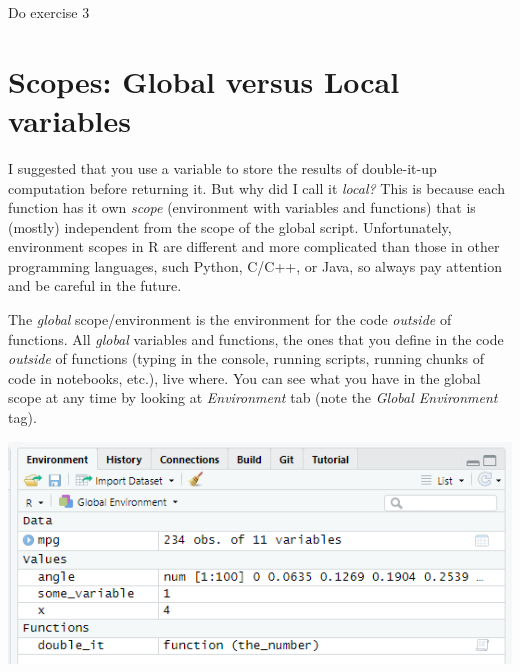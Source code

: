 \documentclass[
]{book}
\begin{document}
Do exercise 3

\hypertarget{scopes-global-versus-local-variables}{%
\section{Scopes: Global versus Local variables}\label{scopes-global-versus-local-variables}}

I suggested that you use a variable to store the results of double-it-up computation before returning it. But why did I call it \emph{local?} This is because each function has it own \emph{scope} (environment with variables and functions) that is (mostly) independent from the scope of the global script. Unfortunately, environment scopes in R are different and more complicated than those in other programming languages, such Python, C/C++, or Java, so always pay attention and be careful in the future.

The \emph{global} scope/environment is the environment for the code \emph{outside} of functions. All \emph{global} variables and functions, the ones that you define in the code \emph{outside} of functions (typing in the console, running scripts, running chunks of code in notebooks, etc.), live where. You can see what you have in the global scope at any time by looking at \emph{Environment} tab (note the \emph{Global Environment} tag).

\begin{center}\includegraphics[width=0.7\linewidth]{images/environment-tab} \end{center}
\end{document}
